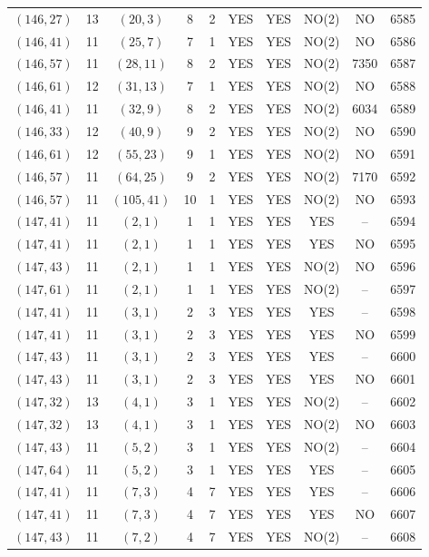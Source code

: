 \begin{longtable}{|c|c|c|c|c|c|c|c|c|c|}
$(146, 27)$ & 13 & $(20, 3)$ & 8 & 2 & YES & YES & NO(2) & NO & 6585\\
$(146, 41)$ & 11 & $(25, 7)$ & 7 & 1 & YES & YES & NO(2) & NO & 6586\\
$(146, 57)$ & 11 & $(28, 11)$ & 8 & 2 & YES & YES & NO(2) & 7350 & 6587\\
$(146, 61)$ & 12 & $(31, 13)$ & 7 & 1 & YES & YES & NO(2) & NO & 6588\\
$(146, 41)$ & 11 & $(32, 9)$ & 8 & 2 & YES & YES & NO(2) & 6034 & 6589\\
$(146, 33)$ & 12 & $(40, 9)$ & 9 & 2 & YES & YES & NO(2) & NO & 6590\\
$(146, 61)$ & 12 & $(55, 23)$ & 9 & 1 & YES & YES & NO(2) & NO & 6591\\
$(146, 57)$ & 11 & $(64, 25)$ & 9 & 2 & YES & YES & NO(2) & 7170 & 6592\\
$(146, 57)$ & 11 & $(105, 41)$ & 10 & 1 & YES & YES & NO(2) & NO & 6593\\
$(147, 41)$ & 11 & $(2, 1)$ & 1 & 1 & YES & YES & YES & -- & 6594\\
$(147, 41)$ & 11 & $(2, 1)$ & 1 & 1 & YES & YES & YES & NO & 6595\\
$(147, 43)$ & 11 & $(2, 1)$ & 1 & 1 & YES & YES & NO(2) & NO & 6596\\
$(147, 61)$ & 11 & $(2, 1)$ & 1 & 1 & YES & YES & NO(2) & -- & 6597\\
$(147, 41)$ & 11 & $(3, 1)$ & 2 & 3 & YES & YES & YES & -- & 6598\\
$(147, 41)$ & 11 & $(3, 1)$ & 2 & 3 & YES & YES & YES & NO & 6599\\
$(147, 43)$ & 11 & $(3, 1)$ & 2 & 3 & YES & YES & YES & -- & 6600\\
$(147, 43)$ & 11 & $(3, 1)$ & 2 & 3 & YES & YES & YES & NO & 6601\\
$(147, 32)$ & 13 & $(4, 1)$ & 3 & 1 & YES & YES & NO(2) & -- & 6602\\
$(147, 32)$ & 13 & $(4, 1)$ & 3 & 1 & YES & YES & NO(2) & NO & 6603\\
$(147, 43)$ & 11 & $(5, 2)$ & 3 & 1 & YES & YES & NO(2) & -- & 6604\\
$(147, 64)$ & 11 & $(5, 2)$ & 3 & 1 & YES & YES & YES & -- & 6605\\
$(147, 41)$ & 11 & $(7, 3)$ & 4 & 7 & YES & YES & YES & -- & 6606\\
$(147, 41)$ & 11 & $(7, 3)$ & 4 & 7 & YES & YES & YES & NO & 6607\\
$(147, 43)$ & 11 & $(7, 2)$ & 4 & 7 & YES & YES & NO(2) & -- & 6608\\

\end{longtable}
